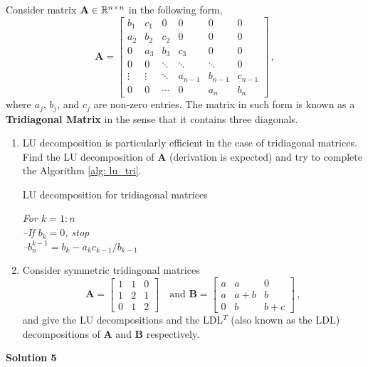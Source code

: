 \documentclass[english,onecolumn]{IEEEtran}
\begin{document}
\noindent Consider matrix ${\bf A} \in \mathbb{R}^{n\times n}$ in the following form,
\[
\mathbf{A} = 
\begin{bmatrix}
	b_1 & c_1 &  0  &  0 & 0  & 0 \\
	a_2 & b_2 & c_2 &  0 & 0  & 0 \\
	0   & a_3 & b_3 & c_3 & 0 & 0 \\
	0   & 0 & \ddots & \ddots& \ddots&0\\
	\vdots & \vdots & \ddots& a_{n-1}& b_{n-1}& c_{n-1}\\
	0 & 0 & \cdots & 0 & a_{n} & b_n 
\end{bmatrix}\,,
\]
where $a_j$, $b_j$, and $c_j$ are non-zero entries.
The matrix in such form is known as a \textbf{Tridiagonal Matrix} in the sense that it contains three diagonals.
\begin{enumerate}
	\item LU decomposition is particularly efficient in the case of tridiagonal matrices. Find the LU decomposition of $\mathbf{A}$ (derivation is expected) and try to complete the Algorithm \ref{alg: lu_tri}.
\begin{algorithm}[htbp]
\label{alg: lu_tri}
\caption{LU decomposition for tridiagonal matrices}
\SetAlgoLined
{}
\textit{For $k=1:n$}\\
\textit{--If $b_{k}=0$, stop}\\
\textit{--$b_n^{k-1}=b_k-a_kc_{k-1}/b_{k-1}$}
\end{algorithm}
\item
Consider symmetric tridiagonal matrices
\[
\mathbf{A} = \begin{bmatrix}
    1 & 1 & 0\\
    1 & 2 & 1 \\
    0 & 1 & 2 
\end{bmatrix}
\quad \text{and  }
\mathbf{B}= \begin{bmatrix}
    a & a & 0 \\
    a & a+b & b \\
    0 & b & b+c
\end{bmatrix}\,,
\]
and give the LU decompositions and the LDL$^T$ (also known as the LDL) decompositions of $\mathbf{A}$ and $\mathbf{B}$ respectively.
\end{enumerate}
\noindent\textbf{Solution 5}
\end{document}
